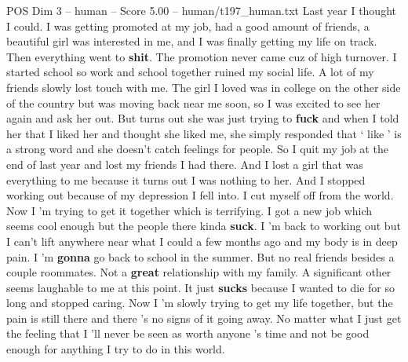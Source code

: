 \begin{textsample}{POS Dim 3 – human – Score 5.00 – human/t197\_human.txt}  \label{ex:f3_pos_001}
Last year I thought I could.
I was getting promoted at my job, had a good amount of friends, a beautiful girl was interested in me, and I was finally getting my life on track.
Then everything went to \textbf{shit}.
The promotion never came cuz of high turnover.
I started school so work and school together ruined my social life.
A lot of my friends slowly lost touch with me.
The girl I loved was in college on the other side of the country but was moving back near me soon, so I was excited to see her again and ask her out.
But turns out she was just trying to \textbf{fuck} and when I told her that I liked her and thought she liked me, she simply responded that ‘ like ’ is a strong word and she doesn't catch feelings for people.
So I quit my job at the end of last year and lost my friends I had there.
And I lost a girl that was everything to me because it turns out I was nothing to her.
And I stopped working out because of my depression I fell into.
I cut myself off from the world.
Now I ’m trying to get it together which is terrifying.
I got a new job which seems cool enough but the people there kinda \textbf{suck}.
I ’m back to working out but I can't lift anywhere near what I could a few months ago and my body is in deep pain.
I ’m \textbf{gonna} go back to school in the summer.
But no real friends besides a couple roommates.
Not a \textbf{great} relationship with my family.
A significant other seems laughable to me at this point.
It just \textbf{sucks} because I wanted to die for so long and stopped caring.
Now I ’m slowly trying to get my life together, but the pain is still there and there ’s no signs of it going away.
No matter what I just get the feeling that I ’ll never be seen as worth anyone ’s time and not be good enough for anything I try to do in this world.

\end{textsample}
